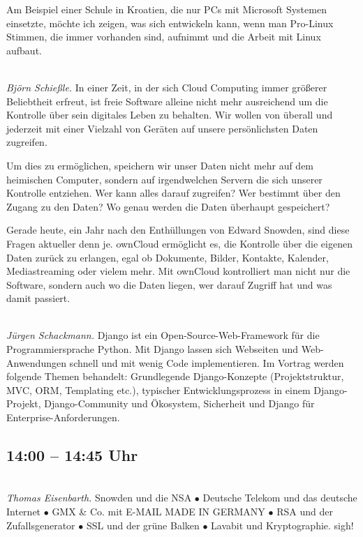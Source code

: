 \documentclass[10pt,a4paper,ngerman,landscape]{scrartcl}
\let\origdescription\description
\renewenvironment{description}{
  \setlength{\leftmargini}{0em}
  \origdescription
  \setlength{\itemindent}{0em}
  \setlength{\itemsep}{1.2em}
  \setlength{\labelsep}{\textwidth}
}
{\endlist}
\newcommand{\vorschub}{\mbox{}\\[-0.5em]}
\begin{document}
\begin{multicols}{3}
\begin{description}
Am Beispiel einer Schule in Kroatien, die nur PCs mit Microsoft Systemen
einsetzte, möchte ich zeigen, was sich entwickeln kann, wenn man Pro-Linux
Stimmen, die immer vorhanden sind, aufnimmt und die Arbeit mit Linux
aufbaut.




\item[ownCloud -- meine Daten gehören mir!]\vorschub
\textsl{Björn Schießle.}
In einer Zeit, in der sich Cloud Computing immer größerer Beliebtheit erfreut,
ist freie Software alleine nicht mehr ausreichend um die Kontrolle über sein
digitales Leben zu behalten. Wir wollen von überall und jederzeit mit einer
Vielzahl von Geräten auf unsere persönlichsten Daten zugreifen.

Um dies zu
ermöglichen, speichern wir unser Daten nicht mehr auf dem heimischen Computer,
sondern auf irgendwelchen Servern die sich unserer Kontrolle entziehen. Wer
kann alles darauf zugreifen? Wer bestimmt über den Zugang zu den Daten? Wo
genau werden die Daten überhaupt gespeichert?

Gerade heute, ein Jahr nach den
Enthüllungen von Edward Snowden, sind diese Fragen aktueller denn je. own\-Cloud
ermöglicht es, die Kontrolle über die eigenen Daten zurück zu erlangen, egal ob
Dokumente, Bilder, Kontakte, Kalender, Mediastreaming oder vielem mehr. Mit
ownCloud kontrolliert man nicht nur die Software, sondern auch wo die Daten
liegen, wer darauf Zugriff hat und was damit passiert.


\item[Warum Django?]\vorschub
\textsl{Jürgen Schackmann.}
Django ist ein Open-Source-Web-Framework für die Programmiersprache Python.
Mit Django lassen sich Webseiten und Web-Anwendungen schnell und mit
wenig Code implementieren. Im Vortrag werden folgende Themen behandelt:
Grundlegende Django-Konzepte (Projektstruktur, MVC, ORM, Templating etc.),
typischer Entwicklungsprozess in einem Django-Projekt,
Django-Community und Ökosystem, Sicherheit und Django für Enterprise-Anforderungen.
\end{description}

\subsection{14:00 -- 14:45 Uhr}

\begin{description}
\item[Quo vadis, IT-Sicherheit?]\vorschub
\textsl{Thomas Eisenbarth.}
Snowden und die NSA $\bullet$ Deutsche Telekom und das deutsche Internet $\bullet$ GMX \& Co.
mit E-MAIL MADE IN GERMANY $\bullet$ RSA und der Zufallsgenerator $\bullet$ SSL und der grüne
Balken $\bullet$ Lavabit und Kryptographie. sigh!


\end{description}
\end{multicols}
\end{document}
